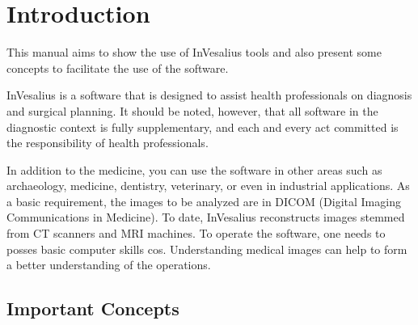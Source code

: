 \chapter{Introduction}

This manual aims to show the use of InVesalius tools and also present some concepts to facilitate the use of the software.


InVesalius is a software that is designed to assist health professionals on diagnosis and surgical planning. It should be noted, however, that all software in the diagnostic context is fully supplementary, and each and every act committed is the responsibility of health professionals.
 

In addition to the medicine, you can use the software in other areas such as archaeology, medicine, dentistry, veterinary, or even in industrial applications. As a basic requirement, the images to be analyzed are in DICOM (Digital Imaging Communications in Medicine). To date, InVesalius reconstructs images stemmed from CT scanners and MRI machines. To operate the software, one needs to posses basic computer skills cos. Understanding medical images can help to form a better understanding of the operations.

\section{Important Concepts}

